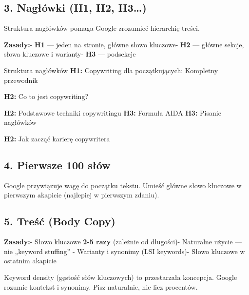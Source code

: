 \documentclass[
  12pt,
  a4paper,
  twoside,
  openright,
  12pt,
  DIV=12,
  BCOR=12mm]{scrbook}
\begin{document}
\subsection{3. Nagłówki (H1, H2,
H3\ldots)}\label{nagux142uxf3wki-h1-h2-h3}

Struktura nagłówków pomaga Google zrozumieć hierarchię treści.

\textbf{Zasady:}\newline - \textbf{H1} --- jeden na stronie, główne
słowo kluczowe\newline - \textbf{H2} --- główne sekcje, słowa kluczowe i
warianty\newline - \textbf{H3} --- podsekcje

\begin{przyklad}{Struktura nagłówków}
\textbf{H1:} Copywriting dla początkujących: Kompletny przewodnik

\textbf{H2:} Co to jest copywriting?

\textbf{H2:} Podstawowe techniki copywritingu
\hspace{1cm}\textbf{H3:} Formuła AIDA
\hspace{1cm}\textbf{H3:} Pisanie nagłówków

\textbf{H2:} Jak zacząć karierę copywritera
\end{przyklad}

\subsection{4. Pierwsze 100 słów}\label{pierwsze-100-sux142uxf3w}

Google przywiązuje wagę do początku tekstu. Umieść główne słowo kluczowe
w pierwszym akapicie (najlepiej w pierwszym zdaniu).

\subsection{5. Treść (Body Copy)}\label{treux15bux107-body-copy}

\textbf{Zasady:}\newline - Słowo kluczowe \textbf{2-5 razy} (zależnie od
długości)\newline - Naturalne użycie --- nie „keyword stuffing''\newline
- Warianty i synonimy (LSI keywords)\newline - Słowo kluczowe w ostatnim
akapicie

\begin{uwaga}
Keyword density (gęstość słów kluczowych) to przestarzała koncepcja. Google rozumie kontekst i synonimy. Pisz naturalnie, nie licz procentów.
\end{uwaga}
\end{document}

